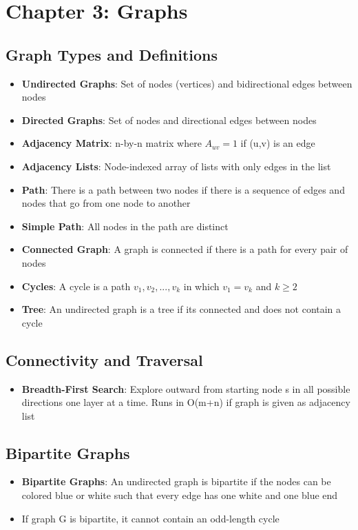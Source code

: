 \documentclass[notitlepage]{article}
\begin{document}
 \section{Chapter 3: Graphs}
    \subsection{Graph Types and Definitions}
    \begin{itemize}
        \item \textbf{Undirected Graphs}: Set of nodes (vertices) and bidirectional edges between nodes
        \item \textbf{Directed Graphs}: Set of nodes and directional edges between nodes
        \item \textbf{Adjacency Matrix}: n-by-n matrix where $A_{uv} = 1$ if (u,v) is an edge
        \item \textbf{Adjacency Lists}: Node-indexed array of lists with only edges in the list
        \item \textbf{Path}: There is a path between two nodes if there is a sequence of edges and nodes
            that go from one node to another
        \item \textbf{Simple Path}: All nodes in the path are distinct
        \item \textbf{Connected Graph}: A graph is connected if there is a path for every pair of nodes
        \item \textbf{Cycles}: A cycle is a path $v_1,v_2,...,v_k$ in which $v_1=v_k$ and $k \geq 2$
        \item \textbf{Tree}: An undirected graph is a tree if its connected and does not contain a cycle
    \end{itemize}
    
    \subsection{Connectivity and Traversal}
    \begin{itemize}
        \item \textbf{Breadth-First Search}: Explore outward from starting node s in all possible directions
            one layer at a time. Runs in O(m+n) if graph is given as adjacency list
    \end{itemize}
    
    \subsection{Bipartite Graphs}
    \begin{itemize}
        \item \textbf{Bipartite Graphs}: An undirected graph is bipartite if the nodes can be colored blue or
            white such that every edge has one white and one blue end
        \item If graph G is bipartite, it cannot contain an odd-length cycle
    \end{itemize}
\end{document}

